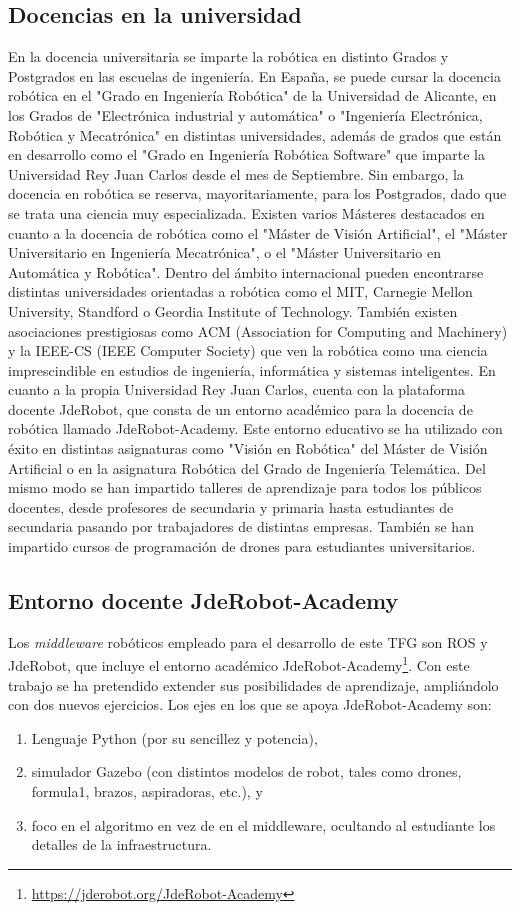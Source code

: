 \subsection{Docencias en la universidad}
En la docencia universitaria se imparte la robótica en distinto Grados y Postgrados en las escuelas de ingeniería. En España, se puede cursar la docencia robótica en el "Grado en Ingeniería Robótica" de la Universidad de Alicante, en los Grados de "Electrónica industrial y automática" o "Ingeniería Electrónica, Robótica y Mecatrónica" en distintas universidades, además de grados que están en desarrollo como el "Grado en Ingeniería Robótica Software" que imparte la Universidad Rey Juan Carlos desde el mes de Septiembre. Sin embargo, la docencia en robótica se reserva, mayoritariamente, para los Postgrados, dado que se trata una ciencia muy especializada. Existen varios Másteres destacados en cuanto a la docencia de robótica como el "Máster de Visión Artificial", el "Máster Universitario en Ingeniería Mecatrónica", o el "Máster Universitario en Automática y Robótica".
Dentro del ámbito internacional pueden encontrarse distintas universidades orientadas a robótica como el MIT, Carnegie Mellon University, Standford o Geordia Institute of Technology. También existen asociaciones prestigiosas como ACM (Association for Computing and Machinery) y la IEEE-CS (IEEE Computer Society) que ven la robótica como una ciencia imprescindible en estudios de ingeniería, informática y sistemas inteligentes.
En cuanto a la propia Universidad Rey Juan Carlos, cuenta con la plataforma docente JdeRobot, que consta de un entorno académico para la docencia de robótica llamado JdeRobot-Academy. Este entorno educativo se ha utilizado con éxito en distintas asignaturas como "Visión en Robótica" del Máster de Visión Artificial o en la asignatura Robótica del Grado de Ingeniería Telemática. Del mismo modo se han impartido talleres de aprendizaje para todos los públicos docentes, desde profesores de secundaria y primaria hasta estudiantes de secundaria pasando por trabajadores de distintas empresas. También se han impartido cursos de programación de drones para estudiantes universitarios.

\subsection{Entorno docente JdeRobot-Academy}
Los \textit{middleware} robóticos empleado para el desarrollo de este TFG son ROS y JdeRobot, que incluye el entorno académico JdeRobot-Academy\footnote{\url{https://jderobot.org/JdeRobot-Academy}}. Con este trabajo se ha pretendido extender sus posibilidades de aprendizaje, ampliándolo con dos nuevos ejercicios.
Los ejes en los que se apoya JdeRobot-Academy son:
\begin{enumerate}[label=\alph*)]
	\item Lenguaje Python (por su sencillez y potencia),
	\item simulador Gazebo (con distintos modelos de robot, tales como drones, formula1, brazos, aspiradoras, etc.), y
	\item foco en el algoritmo en vez de en el middleware, ocultando al estudiante los detalles de la infraestructura.
\end{enumerate}

